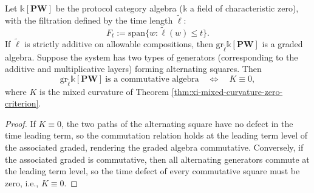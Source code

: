 \begin{theorem}\label{thm:xi-time-filtration-pbw-graded-commutative}
Let \(\mathbb k[\mathbf{PW}]\) be the protocol category algebra (\(\mathbb k\) a field of characteristic zero), with the filtration defined by the time length \(\widetilde{\ell}\):
\[
F_t:=\mathrm{span}\{w:\widetilde{\ell}(w)\le t\}.
\]
If \(\widetilde{\ell}\) is strictly additive on allowable compositions, then \(\mathrm{gr}_{\widetilde{\ell}}\mathbb k[\mathbf{PW}]\) is a graded algebra.
Suppose the system has two types of generators (corresponding to the additive and multiplicative layers) forming alternating squares. Then
\[
\mathrm{gr}_{\widetilde{\ell}}\mathbb k[\mathbf{PW}]\ \text{is a commutative algebra}
\quad\Longleftrightarrow\quad
K\equiv 0,
\]
where \(K\) is the mixed curvature of Theorem \ref{thm:xi-mixed-curvature-zero-criterion}.
\end{theorem}

\begin{proof}
If \(K\equiv 0\), the two paths of the alternating square have no defect in the time leading term, so the commutation relation holds at the leading term level of the associated graded, rendering the graded algebra commutative.
Conversely, if the associated graded is commutative, then all alternating generators commute at the leading term level, so the time defect of every commutative square must be zero, i.e., \(K\equiv 0\).
\end{proof}

